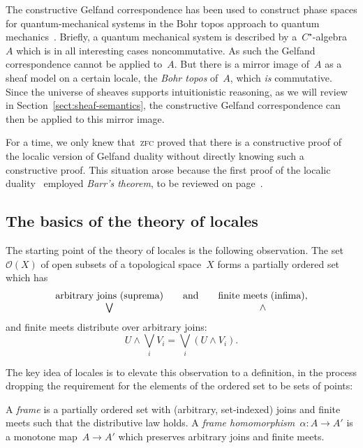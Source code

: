 \documentclass{ws-rv9x6}
\renewcommand{\O}{\mathcal{O}}
\renewcommand{\_}{\mathpunct{.}}
\newcommand{\?}{\,{:}\,}
\begin{document}
The constructive Gelfand correspondence has been used to construct phase spaces
for quantum-mechanical systems in the Bohr topos approach to quantum
mechanics~\cite{butterfield-hamilton-isham:bohr,heunen-landsman-spitters:bohr,henry:bohr}.
Briefly, a quantum mechanical system is described by a~$C^\star$-algebra~$A$
which is in all interesting cases noncommutative. As such the Gelfand correspondence cannot be
applied to~$A$. But there is a mirror image of~$A$ as a sheaf model on a
certain locale, the \emph{Bohr topos} of~$A$, which \emph{is} commutative.
Since the universe of sheaves supports intuitionistic reasoning, as we will
review in Section~\ref{sect:sheaf-semantics}, the constructive Gelfand
correspondence can then be applied to this mirror image.

\begin{remark}For a time, we only knew that~\textsc{zfc} proved that there is a
constructive proof of the localic version of Gelfand duality without directly
knowing such a constructive proof. This situation arose because the first proof
of the localic duality~\cite{banaschewski-mulvey:gelfand} employed \emph{Barr's
theorem}, to be reviewed on page~\pageref{par:barr}.\end{remark}


\subsection{The basics of the theory of locales}

The starting point of the theory of locales is the following
observation. The set~$\O(X)$ of open subsets of a topological
space~$X$ forms a partially ordered set which has
\[ \begin{array}{@{}ccc@{}}
\text{arbitrary joins (suprema)}
&\quad\text{and}\quad&
\text{finite meets (infima)}, \\
\bigvee && \wedge
\end{array} \]
and finite meets distribute over arbitrary joins:
\[ U \wedge \bigvee_i V_i = \bigvee_i (U \wedge V_i). \]

The key idea of locales is to elevate this observation to a definition, in the
process dropping the requirement for the elements of the ordered set to be sets
of points:
\begin{definition}A \emph{frame} is a partially ordered set with (arbitrary,
set-indexed) joins and finite meets such that the distributive law
holds. A \emph{frame homomorphism~$\alpha : A \to A'$} is a monotone map~$A
\to A'$ which preserves arbitrary joins and finite meets.\end{definition}
\end{document}
